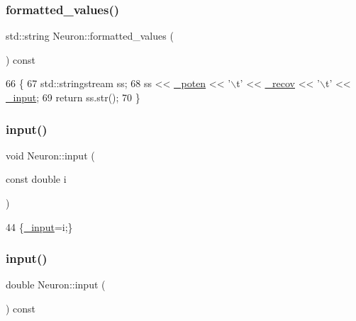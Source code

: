 \subsubsection{\texorpdfstring{formatted\+\_\+values()}{formatted\_values()}}
{\footnotesize\ttfamily std\+::string Neuron\+::formatted\+\_\+values (\begin{DoxyParamCaption}{ }\end{DoxyParamCaption}) const}


\begin{DoxyCode}
66                                          \{
67     std::stringstream ss;
68     ss << \hyperlink{classNeuron_a7f7fdc3f9550b870351c60f618c11376}{\_poten} << \textcolor{charliteral}{'\(\backslash\)t'} << \hyperlink{classNeuron_a7bc9f5b85125f2c2596b64766796002b}{\_recov} << \textcolor{charliteral}{'\(\backslash\)t'} << \hyperlink{classNeuron_ac1311b3b22122a67743615ee40caba6d}{\_input};
69     \textcolor{keywordflow}{return} ss.str();
70 \}
\end{DoxyCode}
\mbox{\label{classNeuron_ab6b4f1a9633eaae9967cc6b226eed5fa}} 
\subsubsection{\texorpdfstring{input()}{input()}\hspace{0.1cm}{\footnotesize\ttfamily [1/2]}}
{\footnotesize\ttfamily void Neuron\+::input (\begin{DoxyParamCaption}\item[{const double}]{i }\end{DoxyParamCaption})\hspace{0.3cm}{\ttfamily [inline]}}


\begin{DoxyCode}
44 \{\hyperlink{classNeuron_ac1311b3b22122a67743615ee40caba6d}{\_input}=i;\}
\end{DoxyCode}
\mbox{\label{classNeuron_ac00c31820b58e9c6f909db6a12e58b34}} 
\subsubsection{\texorpdfstring{input()}{input()}\hspace{0.1cm}{\footnotesize\ttfamily [2/2]}}
{\footnotesize\ttfamily double Neuron\+::input (\begin{DoxyParamCaption}{ }\end{DoxyParamCaption}) const\hspace{0.3cm}{\ttfamily [inline]}}


